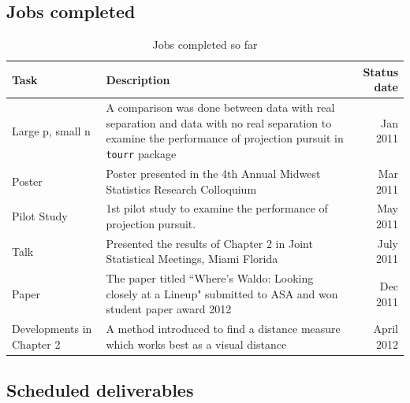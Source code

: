 \documentclass[12]{report}
\begin{document}
\subsection{Jobs completed}

\begin{table}[hbtp]
\caption{Jobs completed so far}
\centering 
\begin{tabular}{|l|p{10cm}|r|} 
\hline
Task &  Description & Status date\\ %
\hline
Large p, small n & A comparison was done between data with real separation and data with no real separation to examine the performance of projection pursuit in \texttt{tourr} package \vspace{.1in} & Jan 2011 \\
Poster & Poster presented in the 4th Annual Midwest Statistics Research Colloquium\vspace{.1in} & Mar 2011 \\ 
Pilot Study & 1st pilot study to examine the performance of projection pursuit.  \vspace{.1in} & May 2011\\ 
Talk & Presented the results of Chapter 2 in Joint Statistical Meetings, Miami Florida \vspace{.1in} & July 2011 \\
Paper & The paper titled ``Where's Waldo: Looking closely at a Lineup" submitted to ASA and won student paper award 2012 \vspace{.1in} & Dec 2011 \\

Developments in Chapter 2 & A method introduced to find a distance measure which works best as a visual distance \vspace{.1in} & April 2012\\
\hline
\end{tabular}
\label{tbl:cjob}
\end{table}	

\subsection{Scheduled deliverables}
\end{document}
